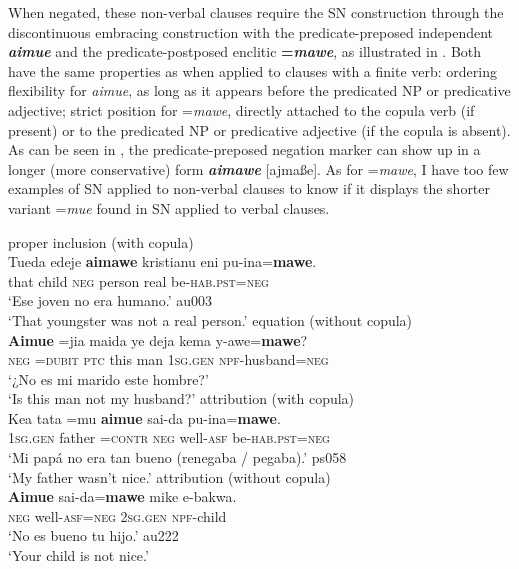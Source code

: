 \documentclass[output=paper]{langsci/langscibook}
\begin{document}
When negated, these non-verbal clauses require the SN construction through
the discontinuous embracing construction with the predicate-preposed
independent \textbf{\textit{aimue}} and the predicate-postposed enclitic
\textbf{=\textit{mawe}}, as illustrated in .
Both have the same properties as when applied to clauses with a finite
verb: ordering flexibility for \textit{aimue}, as long as it appears before
the predicated NP or predicative adjective; strict position for
=\textit{mawe}, directly attached to the copula verb (if present) or to the
predicated NP or predicative adjective (if the copula is absent). As can be
seen in , the predicate-preposed negation marker can show up in a longer (more conservative) form \textbf{\textit{aimawe}} [ajmaße]. As for =\textit{mawe}, I have too few examples of SN applied to non-verbal clauses to know if it displays the shorter variant =\textit{mue} found in SN applied to verbal clauses.
%
\begin{exe}\ex
\label{ex:tacana-inhuman-husband} \begin{xlist}
\ex\label{ex:tacana-inhuman}
proper inclusion (with copula)\\
\gll
  Tueda  edeje{\cb}
  \textbf{aimawe}  kristianu
  eni{\cb}
  pu-ina=\textbf{mawe}.\\
  that  child  \textsc{neg}  person  real  be-\textsc{hab.pst=neg}\\
\glt `Ese joven no era humano.' au003\\
`That youngster was not a real person.'
\ex\label{ex:tacana-husband}
equation (without copula)\\
\gll  \textbf{Aimue}  =jia  maida
ye  deja{\cb}
kema
y-awe{\cb}=\textbf{mawe}?\\
  \textsc{neg}  =\textsc{dubit}  \textsc{ptc}  this  man  \textsc{1sg.gen}
  \textsc{npf}-husband=\textsc{neg}\\
\glt `¿No es mi marido este hombre?'
\parencite[4]{Ottaviano1989}\\
`Is this man not my husband?' 
\ex\label{ex:tacana-nice}  attribution (with copula)\\
\gll {}Kea tata{\cb} =mu
\textbf{aimue}  sai-da
pu-ina=\textbf{mawe}.\\
    \textsc{1sg.gen}  father  =\textsc{contr}  \textsc{neg}
    well\textsc{-asf}  be-\textsc{hab.pst=neg}\\
\glt `Mi papá no era tan bueno (renegaba \slash{}  pegaba).' ps058\\
`My father wasn't nice.' 
  \ex\label{ex:tacana-child}  attribution (without copula)\\
\gll 
    \textbf{Aimue}
    sai-da=\textbf{mawe}
    mike e-bakwa{\cb}.\\
    \textsc{neg}  well-\textsc{asf=neg}  \textsc{2sg.gen}
    \textsc{npf}-child\\
\glt `No es bueno tu hijo.' au222\\
`Your child is not nice.' 
\end{xlist}\end{exe}
\end{document}
